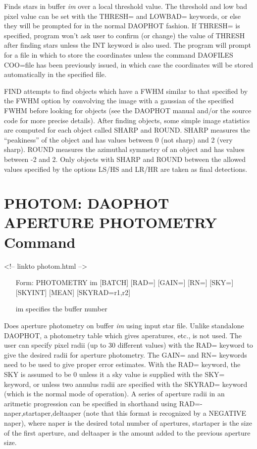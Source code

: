 Finds stars in buffer \textit{im} over a local threshold value. 
The threshold and low bad pixel value can be set
with the THRESH= and LOWBAD= keywords, or else they will be prompted for in
the normal DAOPHOT fashion. If THRESH= is specified, program won't ask user
to confirm (or change) the value of THRESH after finding stars unless the INT keyword is
also used. The program will prompt for a file in which to store the
coordinates unless the command DAOFILES COO=file has been previously
issued, in which case the coordinates will be stored automatically in the
specified file.

FIND attempts to find objects which have a FWHM similar to that specified by
the FWHM option by convolving the image with a gaussian of the specified
FWHM before looking for objects (see the DAOPHOT manual and/or the source
code for more precise details). After finding objects, some simple image
statistics are computed for each object called SHARP and ROUND. SHARP measures
the ``peakiness'' of the object and has values between 0 (not sharp) and
2 (very sharp). ROUND measures the azimuthal symmetry of an object and has
values between -2 and 2. Only objects with SHARP and ROUND between the
allowed values specified by the options LS/HS and LR/HR are taken as final
detections.

\section{PHOTOM: DAOPHOT APERTURE PHOTOMETRY Command}
\begin{rawhtml}
<!-- linkto photom.html -->
\end{rawhtml}
\begin{itemize}
  \item[Form: PHOTOMETRY im {[BATCH]} {[RAD=]} {[GAIN=]} {[RN=]} {[SKY=]} {[SKYINT]} {[MEAN]} {[SKYRAD=r1,r2]}\hfill]{}
  \item[im]{specifies the buffer number}
\end{itemize}

Does aperture photometry on buffer \textit{im} using input star file.  Unlike
standalone DAOPHOT, a photometry table which gives aperatures, etc., is not
used.  The user can specify pixel radii (up to 30 different
values) with the RAD= keyword to give the desired radii for aperture
photometry. The GAIN= and RN= keywords need to be
used to give proper error estimates. With the RAD= keyword, the SKY is
assumed to be 0 unless it a sky value is supplied with the SKY= keyword, or 
unless two annulus radii are specified with the SKYRAD= keyword 
(which is the normal mode of operation).  A series of
aperture radii in an aritmetic progression can be specified in shorthand using
RAD=-naper,startaper,deltaaper (note that this format is recognized by a
NEGATIVE naper), where naper is the desired total number of apertures,
startaper is the size of the first aperture, and deltaaper is the amount
added to the previous aperture size.

